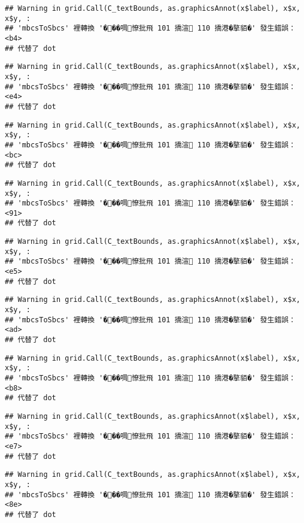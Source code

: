 \documentclass[
]{article}
\begin{document}
\begin{verbatim}
## Warning in grid.Call(C_textBounds, as.graphicsAnnot(x$label), x$x, x$y, :
## 'mbcsToSbcs' 裡轉換 '���啁憭批飛 101 撟渲 110 撟港�摮貊�' 發生錯誤：<b4>
## 代替了 dot
\end{verbatim}

\begin{verbatim}
## Warning in grid.Call(C_textBounds, as.graphicsAnnot(x$label), x$x, x$y, :
## 'mbcsToSbcs' 裡轉換 '���啁憭批飛 101 撟渲 110 撟港�摮貊�' 發生錯誤：<e4>
## 代替了 dot
\end{verbatim}

\begin{verbatim}
## Warning in grid.Call(C_textBounds, as.graphicsAnnot(x$label), x$x, x$y, :
## 'mbcsToSbcs' 裡轉換 '���啁憭批飛 101 撟渲 110 撟港�摮貊�' 發生錯誤：<bc>
## 代替了 dot
\end{verbatim}

\begin{verbatim}
## Warning in grid.Call(C_textBounds, as.graphicsAnnot(x$label), x$x, x$y, :
## 'mbcsToSbcs' 裡轉換 '���啁憭批飛 101 撟渲 110 撟港�摮貊�' 發生錯誤：<91>
## 代替了 dot
\end{verbatim}

\begin{verbatim}
## Warning in grid.Call(C_textBounds, as.graphicsAnnot(x$label), x$x, x$y, :
## 'mbcsToSbcs' 裡轉換 '���啁憭批飛 101 撟渲 110 撟港�摮貊�' 發生錯誤：<e5>
## 代替了 dot
\end{verbatim}

\begin{verbatim}
## Warning in grid.Call(C_textBounds, as.graphicsAnnot(x$label), x$x, x$y, :
## 'mbcsToSbcs' 裡轉換 '���啁憭批飛 101 撟渲 110 撟港�摮貊�' 發生錯誤：<ad>
## 代替了 dot
\end{verbatim}

\begin{verbatim}
## Warning in grid.Call(C_textBounds, as.graphicsAnnot(x$label), x$x, x$y, :
## 'mbcsToSbcs' 裡轉換 '���啁憭批飛 101 撟渲 110 撟港�摮貊�' 發生錯誤：<b8>
## 代替了 dot
\end{verbatim}

\begin{verbatim}
## Warning in grid.Call(C_textBounds, as.graphicsAnnot(x$label), x$x, x$y, :
## 'mbcsToSbcs' 裡轉換 '���啁憭批飛 101 撟渲 110 撟港�摮貊�' 發生錯誤：<e7>
## 代替了 dot
\end{verbatim}

\begin{verbatim}
## Warning in grid.Call(C_textBounds, as.graphicsAnnot(x$label), x$x, x$y, :
## 'mbcsToSbcs' 裡轉換 '���啁憭批飛 101 撟渲 110 撟港�摮貊�' 發生錯誤：<8e>
## 代替了 dot
\end{verbatim}
\end{document}
